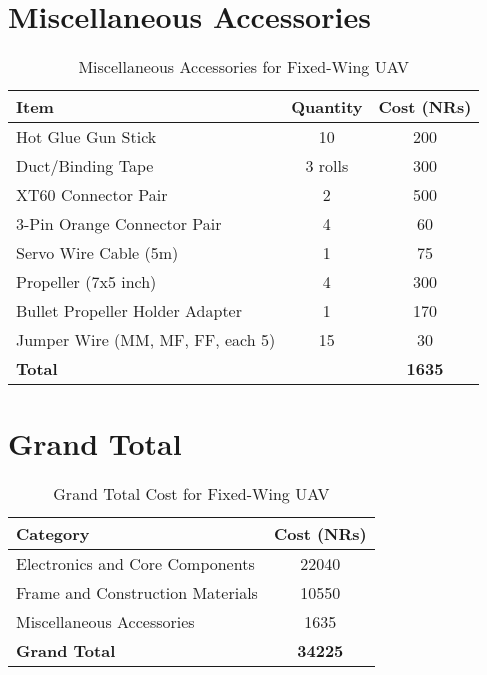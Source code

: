 \newpage
\section*{Miscellaneous Accessories}
\begin{table}[h]
\centering
\begin{tabular}{l c S[table-format=4.0]}
\toprule
\textbf{Item} & \textbf{Quantity} & \textbf{Cost (NRs)} \\
\midrule
Hot Glue Gun Stick & 10 & 200 \\
Duct/Binding Tape & 3 rolls & 300 \\
XT60 Connector Pair & 2 & 500 \\
3-Pin Orange Connector Pair & 4 & 60 \\
Servo Wire Cable (5m) & 1 & 75 \\
Propeller (7x5 inch) & 4 & 300 \\
Bullet Propeller Holder Adapter & 1 & 170 \\
Jumper Wire (MM, MF, FF, each 5) & 15 & 30 \\
\midrule
\textbf{Total} & & \textbf{1635} \\
\bottomrule
\end{tabular}
\caption{Miscellaneous Accessories for Fixed-Wing UAV}
\end{table}

\section*{Grand Total}
\begin{table}[h]
\centering
\begin{tabular}{l S[table-format=5.0]}
\toprule
\textbf{Category} & \textbf{Cost (NRs)} \\
\midrule
Electronics and Core Components & 22040 \\
Frame and Construction Materials & 10550 \\
Miscellaneous Accessories & 1635 \\
\midrule
\textbf{Grand Total} & \textbf{34225} \\
\bottomrule
\end{tabular}
\caption{Grand Total Cost for Fixed-Wing UAV}
\end{table}

